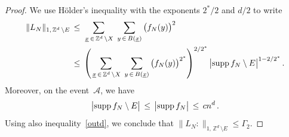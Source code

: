 \documentclass[AHL, Unicode, longabstracts, published]{cedram}
\newcommand{\xx}{{\underline{x}}}
\newcommand*\supp{\text{supp\,}}
\newcommand*\Zd {{\mathbb Z^d}}
\newcommand{\cA}{\mathcal{A}}
\begin{document}
\begin{proof}
We use H\"older's inequality with the exponents $2^*/2$ and $d/2$ to write
\begin{align*}
\|L_N\|_{1,\,\Zd\,\setminus E}
\,&\leq\,
\sum_{\,\xx\,\in
\,\Zd\,\setminus X}\;
\sum_{y\,\in\,B(\xx)}
\big(f_N(y)\big)^{2}
\\
&\leq\,
\left(\sum_{\,\xx\,\in
\,\Zd\,\setminus X}\;
\sum_{y\,\in\,B(\xx)}
\big(f_N(y)\big)^{2^*}\right)^{2/2^*}
\big|
\supp f_N
\setminus E
\big|^{1-2/2^*}\,.
\end{align*}
Moreover, on the event~$\cA$, we have
\[
\big|
\supp f_N
\setminus E
\big|\,\leq\,
\big|
\supp f_N
\big|\,\leq\,cn^d\,.
\]
Using also inequality~\eqref{outd}, we conclude that $\|L_N:\|_{1,\,\Zd\,\setminus E}\leq\Gamma_2$.
\end{proof}


\end{document}
